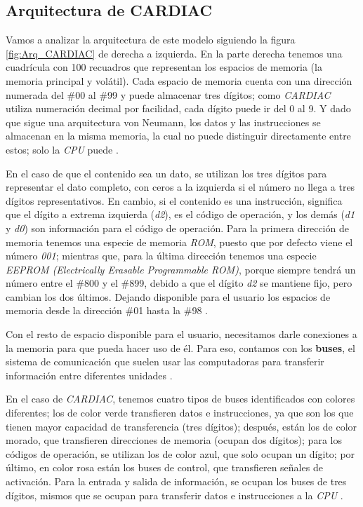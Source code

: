 \documentclass[letterpaper,12pt,oneside]{book}
\begin{document}
	\subsection{Arquitectura de CARDIAC}	
	
	Vamos a analizar la arquitectura de este modelo siguiendo la 
	figura \ref{fig:Arq_CARDIAC} de derecha a izquierda. En la parte
	derecha tenemos una cuadrícula con 100 recuadros que representan 
	los espacios de memoria (la memoria principal y volátil).
	Cada espacio de memoria cuenta con una dirección numerada del \#00 al \#99 
	y puede almacenar tres dígitos; como \textit{CARDIAC} utiliza
	numeración decimal por facilidad, cada dígito puede ir del 0 al 9. Y dado que sigue una arquitectura
	 von Neumann, los datos
	y las instrucciones se almacenan en la misma memoria, 
	la cual no puede distinguir directamente entre estos;  solo 
	la \textit{CPU} puede \cite{fingerman_instruction_1968}.
	
	En el caso de que el contenido sea un dato, se utilizan los tres dígitos 
	para representar el dato completo, con ceros a la 	
	izquierda si el número no llega a tres dígitos representativos. En cambio,
	si el contenido es una instrucción, significa que el dígito a extrema 
	izquierda (\textit{d2}),
	es el código de operación, y los demás (\textit{d1} y \textit{d0}) 
	son información para el código de operación. Para la primera dirección de memoria 
	tenemos una especie de memoria \textit{ROM}, puesto
	que por defecto viene el número \textit{001}; mientras que, para la última dirección
	tenemos una especie \textit{EEPROM (Electrically Erasable Programmable ROM)}, porque
	siempre tendrá un número entre el \#800 y el \#899, debido a que el dígito \textit{d2}
	se mantiene fijo, pero cambian los dos últimos. Dejando disponible
	 para el usuario los espacios de memoria desde la dirección
	 \#01 hasta la \#98 \cite{fingerman_instruction_1968}.
	
	Con el resto de espacio disponible para el usuario, necesitamos
	darle conexiones a la memoria para
	que pueda hacer uso de él. Para eso, contamos con los \textbf{buses},
	el sistema de comunicación que suelen
	usar las computadoras para transferir información entre diferentes unidades 
	\cite{fingerman_instruction_1968}.
 
    En el caso de \textit{CARDIAC}, tenemos cuatro tipos de buses
	identificados con colores diferentes; los de color verde transfieren datos e instrucciones, 
	ya que son los que tienen mayor
	capacidad de transferencia (tres dígitos); después, están los de color morado, que transfieren
	direcciones de memoria (ocupan dos dígitos);
	para los códigos de operación, se utilizan los de color azul, que solo ocupan un dígito;
	por último, en color rosa están los buses de control,
	que transfieren señales de activación. Para la entrada y salida de información,
	se ocupan los buses de tres dígitos, mismos que
	se ocupan para transferir datos e instrucciones a la \textit{CPU} \cite{fingerman_instruction_1968}.
	
\end{document}
